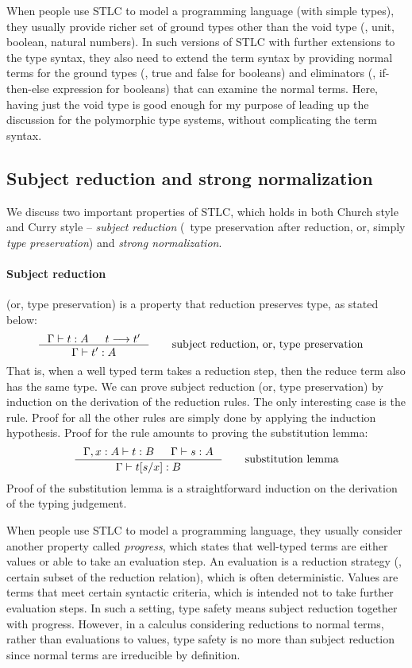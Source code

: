 When people use STLC to model a programming language (with simple types),
they usually provide richer set of ground types other than the void type
(\eg, unit, boolean, natural numbers). In such versions of STLC with further
extensions to the type syntax, they also need to extend the term syntax
by providing normal terms for the ground types (\eg, \textsf{true} and
\textsf{false} for booleans) and eliminators (\eg, if-then-else expression for
booleans) that can examine the normal terms. Here, having just the void type
is good enough for my purpose of leading up the discussion for
the polymorphic type systems, without complicating the term syntax.

\subsection{Subject reduction and strong normalization}\label{sec:stlc:srsn}
We discuss two important properties of STLC, which holds in both
Church style and Curry style --
\emph{subject reduction} (\aka\ type preservation after reduction, or,
simply \emph{type preservation}) and \emph{strong normalization}.

\paragraph{Subject reduction} (or, type preservation) is a property
that reduction preserves type, as stated below:
\begin{align*}
\inference{\Gamma |- t : A  & t --> t'}{\Gamma |- t' : A}
 &\qquad \text{subject reduction, or, type preservation}
\end{align*}
That is, when a well typed term takes a reduction step, then the reduce term
also has the same type. We can prove subject reduction (or, type preservation)
by induction on the derivation of the reduction rules.
The only interesting case is the  rule. Proof for all
the other rules are simply done by applying the induction hypothesis.
Proof for the  rule amounts to proving the substitution lemma:
\[ \inference{\Gamma,x:A |- t : B  & \Gamma |- s : A}{\Gamma |- t[s/x] : B}
   \qquad \text{substitution lemma} \]
Proof of the substitution lemma is a straightforward induction on
the derivation of the typing judgement.

When people use STLC to model a programming language,
they usually consider another property called \emph{progress},
which states that well-typed terms are either values or
able to take an evaluation step. An evaluation is a reduction strategy
(\ie, certain subset of the reduction relation), which is often deterministic.
Values are terms that meet certain syntactic criteria, which is intended not
to take further evaluation steps. In such a setting, type safety means
subject reduction together with progress. However, in a calculus considering
reductions to normal terms, rather than evaluations to values, type safety is
no more than subject reduction since normal terms are irreducible by definition.

